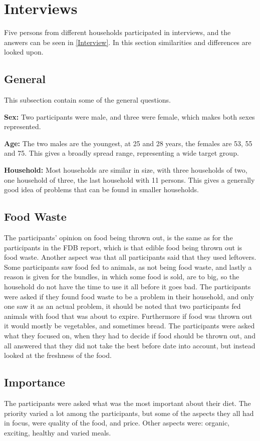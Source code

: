 \section{Interviews}\label{InterviewAnalysis}
Five persons from different households participated in interviews, and the answers can be seen in \cref{Interview}. In this section similarities and differences are looked upon.

\subsection{General}
This subsection contain some of the general questions.

\textbf{Sex:}
Two participants were male, and three were female, which makes both sexes represented.

\textbf{Age:}
The two males are the youngest, at 25 and 28 years, the females are 53, 55 and 75. This gives a broadly spread range, representing a wide target group.

\textbf{Household:}
Most households are similar in size, with three households of two, one household of three, the last household with 11 persons. This gives a generally good idea of problems that can be found in smaller households.

\subsection{Food Waste}
The participants' opinion on food being thrown out, is the same as for the participants in the FDB report, which is that edible food being thrown out is food waste. Another aspect was that
all participants said that they used leftovers. Some participants saw food fed to animals, as not being food waste, and lastly a reason is given for the bundles, in which some food is sold, are to big, so the household do not have the time to use it all before it goes bad. The participants were asked if they found food waste to be a problem in their household, and only one saw it as an actual problem, it should be noted that two participants fed animals with food that was about to expire. Furthermore if food was thrown out it would mostly be vegetables, and sometimes bread. The participants were asked what they focused on, when they had to decide if food should be thrown out, and all answered that they did not take the best before date into account, but instead looked at the freshness of the food.

\subsection{Importance}
The participants were asked what was the most important about their diet. The priority varied a lot among the participants, but some of the aspects they all had in focus, were quality of the food, and price. Other aspects were: organic, exciting, healthy and varied meals.

